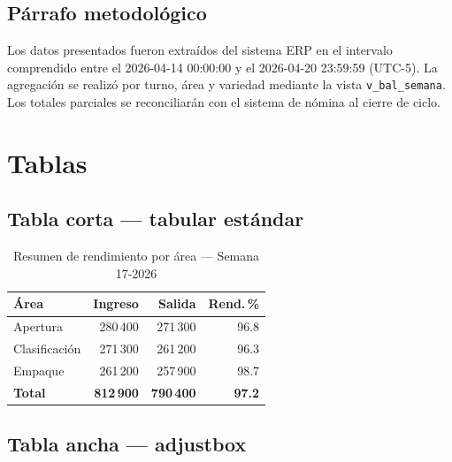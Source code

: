 \documentclass{../base/canon}
\begin{document}
\subsection{Párrafo metodológico}

\begin{ParrafoMetodologico}
Los datos presentados fueron extraídos del sistema ERP en el intervalo comprendido
entre el 2026-04-14 00:00:00 y el 2026-04-20 23:59:59 (UTC-5).  La agregación se
realizó por turno, área y variedad mediante la vista \texttt{v\_bal\_semana}.
Los totales parciales se reconciliarán con el sistema de nómina al cierre de ciclo.
\end{ParrafoMetodologico}

\section{Tablas}

\subsection{Tabla corta — tabular estándar}

\begin{table}[H]
  \centering
  \caption{Resumen de rendimiento por área — Semana 17-2026}
  \begin{tabular}{l r r r}
    \toprule
    \textbf{Área} & \textbf{Ingreso} & \textbf{Salida} & \textbf{Rend.\,\%} \\
    \midrule
    Apertura       & 280\,400 & 271\,300 & 96.8 \\
    Clasificación  & 271\,300 & 261\,200 & 96.3 \\
    Empaque        & 261\,200 & 257\,900 & 98.7 \\
    \midrule
    \textbf{Total} & \textbf{812\,900} & \textbf{790\,400} & \textbf{97.2} \\
    \bottomrule
  \end{tabular}
\end{table}

\subsection{Tabla ancha — adjustbox}
\end{document}
